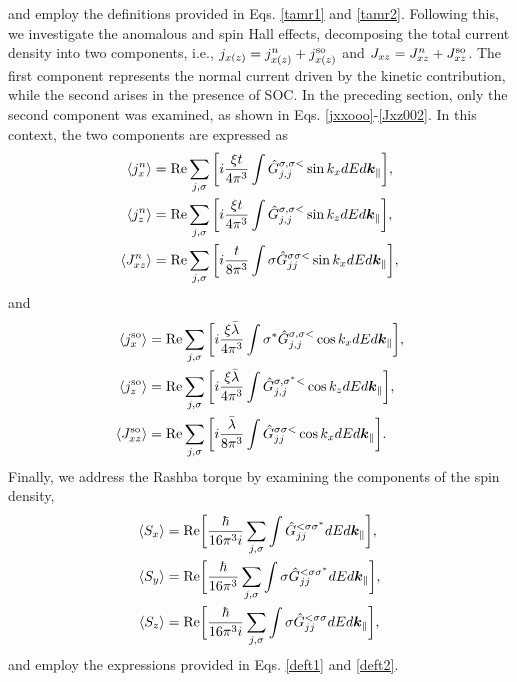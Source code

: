 \documentclass[10pt,pr,twocolumn,showpacs,amssymb,floatfix,superscriptaddress]{revtex4-1}
\newcommand{\tx}{\text}
\newcommand{\para}{\parallel}
\newcommand{\lam}{\lambda}
\newcommand{\sg}{\sigma}
\newcommand{\h}{\hat}
\begin{document}
and employ the definitions provided in Eqs. \eqref{tamr1} and \eqref{tamr2}. Following this, we investigate the anomalous and spin Hall effects, decomposing the total current density into two components, i.e., $j_{x(z)} = j^n_{x(z)} + j^{\rm so}_{x(z)}$ and $J_{xz} = J_{xz}^n + J_{xz}^{\rm so}$. The first component represents the normal current driven by the kinetic contribution, while the second arises in the presence of SOC. In the preceding section, only the second component was examined, as shown in Eqs. \eqref{jxxooo}-\eqref{Jxz002}. In this context, the two components are expressed as
\begin{align}
\langle j_{x}^n \rangle &= \tx{Re} \sum_{j,\sg} \bigg{[}i\frac{\xi t}{4\pi^3}\int  \h G^{\sg,\sg <}_{j,j} \sin k_{x} dE d\bm k _\para \bigg{]}, \\
\langle j_{z}^n \rangle &= \tx{Re} \sum_{j,\sg} \bigg{[}i\frac{\xi t}{4\pi^3}\int  \h G^{\sg,\sg <}_{j,j} \sin k_{z} dE d\bm k _\para \bigg{]}, \\
\langle J_{xz}^n \rangle &= \tx{Re} \sum_{j,\sg} \bigg{[}  i\frac{t}{8\pi^3}\int    \sg \h G_{jj}^{\sg\sg <}  \sin k_x   dE d\bm k_\para  \bigg{]}, 
\end{align}
and
\begin{align}
\langle j_x^{\rm so} \rangle &=  \tx{Re} \sum_{j, \sg} \bigg{[} i\frac{\xi\bar{\lam}}{4\pi^3} \int  \sg^* \h G^{\sg,\sg <}_{j,j} \cos k_x   dE d\bm k _\para \bigg{]}, \\
\langle j_z^{\rm so} \rangle &= \tx{Re}  \sum_{j,\sg} \bigg{[}i\frac{\xi\bar{\lam}}{4\pi^3} \int  \h G^{\sg,\sg^* <}_{j,j} \cos k_z  dE d\bm k _\para \bigg{]}, \\
\langle J_{xz}^{\rm so} \rangle &= \tx{Re} \sum_{j,\sg} \bigg{[} i\frac{\bar{\lam}}{8\pi^3}  \int  \h G_{jj}^{\sg\sg <}  \cos k_x dE d\bm k_\para \bigg{]}. 
\end{align}
Finally, we address the Rashba torque by examining the components of the spin density,
\begin{align}
\langle S_x \rangle &= \tx{Re}\bigg{[}\frac{\hbar}{16\pi^3i}  \sum_{j,\sg} \int  \h G_{jj}^{< \sg \sg^*} dE d\bm k _\para\bigg{]}, \\
\langle S_y \rangle &= \tx{Re}\bigg{[}\frac{\hbar}{16\pi^3}  \sum_{j,\sg} \int  \sg \h G_{jj}^{< \sg \sg^*} dE d\bm k _\para\bigg{]}, \\
\langle S_z \rangle &= \tx{Re}\bigg{[}\frac{\hbar}{16\pi^3i}  \sum_{j,\sg} \int \sg \h G_{jj}^{< \sg \sg} dE d\bm k _\para\bigg{]},
\end{align}
and employ the expressions provided in Eqs. \eqref{deft1} and \eqref{deft2}. 
\end{document}
